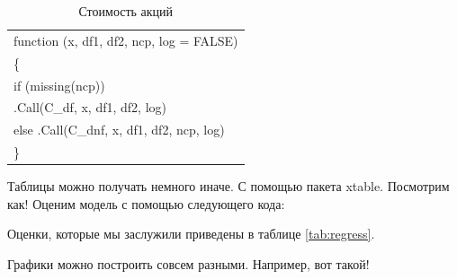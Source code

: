 \documentclass[12pt, a4paper]{article}
\begin{document}
\begin{table}[h!]
\begin{center}

\begin{tabular}{l}
\hline
\\
\hline
function (x, df1, df2, ncp, log = FALSE)\\
\hline
\{\\
\hline
if (missing(ncp))\\
\hline
.Call(C\_df, x, df1, df2, log)\\
\hline
else .Call(C\_dnf, x, df1, df2, ncp, log)\\
\hline
\}\\
\hline
\end{tabular}


\caption{Стоимость акций}
\end{center} 
\end{table}


Таблицы можно получать немного иначе. С помощью пакета xtable. Посмотрим как! Оценим модель с помощью следующего кода: 

\begin{knitrout}
\color{fgcolor}\begin{kframe}
\begin{alltt}
 \hlkwb{=} 
 \hlkwb{<-} \hlstd{(}
\end{alltt}


{\ttfamily\noindent\bfseries\color{errorcolor}{\#\# Error in terms.formula(formula, data = data): аргумент 'data' неправильного типа}}\end{kframe}
\end{knitrout}


Оценки, которые мы заслужили приведены в таблице \ref{tab:regress}. 

\begin{kframe}


{\ttfamily\noindent\bfseries\color{errorcolor}{\#\# Error in summary(model): объект 'model' не найден}}\end{kframe}


\begin{kframe}


{\ttfamily\noindent\bfseries\color{errorcolor}{\#\# Error in summary(model): объект 'model' не найден}}\end{kframe}

Графики можно построить совсем разными. Например, вот такой! 
\end{document}
